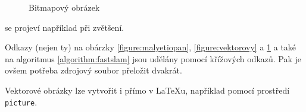 \documentclass[a4paper, 11pt]{article}
\begin{document}
    \begin{figure}[h]
		\centering
		\caption{Bitmapový obrázek}
		\label{figure:bitmapovy}
    \end{figure}
    \bigskip
    \noindent se projeví například při zvětšení.

    Odkazy (nejen ty) na obárzky \ref{figure:malyetiopan}, \ref{figure:vektorovy} a \ref{figure:bitmapovy} a také na algoritmus \ref{algorithm:fastslam} jsou udělány pomocí křížových odkazů. Pak je ovšem potřeba zdrojový soubor přeložit dvakrát.

    Vektorové obrázky lze vytvořit i přímo v {\LaTeX}u, například pomocí prostředí \verb|picture|.
\end{document}
